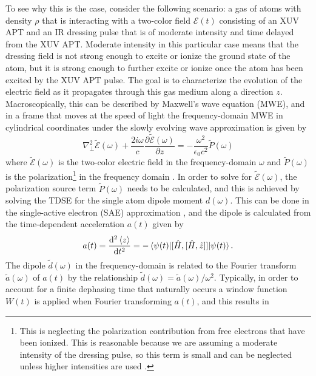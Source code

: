 To see why this is the case, consider the following scenario: a gas of atoms with density $\rho$ that is interacting with a two-color field $\mathcal{E}(t)$ consisting of an XUV APT and an IR dressing pulse that is of moderate intensity and time delayed from the XUV APT. Moderate intensity in this particular case means that the dressing field is not strong enough to excite or ionize the ground state of the atom, but it is strong enough to further excite or ionize once the atom has been excited by the XUV APT pulse.  The goal is to characterize the evolution of the electric field as it propagates through this gas medium along a direction $z$. Macroscopically, this can be described by Maxwell's wave equation (MWE), and in a frame that moves at the speed of light the frequency-domain MWE in cylindrical coordinates under the slowly evolving wave approximation is given by
\begin{equation}
	\label{eqn:MWE}
	\nabla_{\perp}^{2}\tilde{\mathcal{E}}(\omega) + \frac{2i\omega}{c}\frac{\partial \tilde{\mathcal{E}}(\omega)}{\partial z} = -\frac{\omega^2}{\epsilon_0 c^2}\tilde{P}(\omega)
\end{equation}
where $\tilde{\mathcal{E}}(\omega)$ is the two-color electric field in the frequency-domain $\omega$ and $\tilde{P}(\omega)$ is the polarization\footnote{This is neglecting the polarization contribution from free electrons that have been ionized.  This is reasonable because we are assuming a moderate intensity of the dressing pulse, so this term is small and can be neglected unless higher intensities are used \cite{gaardeTransientAbsorptionReshaping2011}.} in the frequency domain \cite{jacksonClassicalElectrodynamics1999, brabecIntenseFewcycleLaser2000, wuTheoryStrongfieldAttosecond2016, gaardeTransientAbsorptionReshaping2011}. In order to solve for $\tilde{\mathcal{E}}(\omega)$, the polarization source term $\tilde{P}(\omega)$ needs to be calculated, and this is achieved by solving the TDSE for the single atom dipole moment $d(\omega)$.  This can be done in the single-active electron (SAE) approximation \cite{eberlyNumericalExperimentsStrong1992, schaferHighHarmonicGeneration1997}, and the dipole is calculated from the time-dependent acceleration $a(t)$ given by 
\begin{equation}
	a(t)=\frac{\mathop{}\!\mathrm{d}^2 \braket{z}}{\mathop{}\!\mathrm{d} t^2} = -\braket{\psi(t)|[\hat{H},[\hat{H},\hat{z}]]|\psi(t)}.
\end{equation}
The dipole $\tilde{d}(\omega)$ in the frequency-domain is related to the Fourier transform $\tilde{a}(\omega)$ of $a(t)$ by the relationship $\tilde{d}(\omega)=\tilde{a}(\omega)/\omega^2$.  Typically, in order to account for a finite dephasing time that naturally occurs a window function $W(t)$ is applied when Fourier transforming $a(t)$, and this results in
